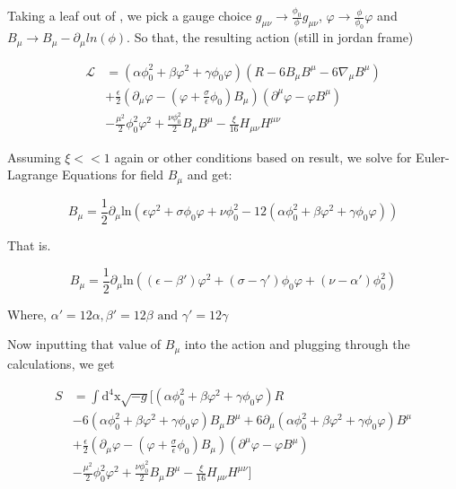 \documentclass{article}
\begin{document}
Taking a leaf out of \cite{barker2024poincaregaugetheoryconformal}, we pick a gauge choice $g_{\mu \nu} \rightarrow \frac{\phi_0}{\phi} g_{\mu \nu}$, $\varphi \rightarrow \frac{\phi}{\phi_0} \varphi$ and $B_{\mu} \rightarrow B_{\mu} - \partial_{\mu} ln(\phi)$. So that, the resulting action (still in jordan frame)

\begin{equation}
    \begin{aligned}
        \mathcal{L} &= (\alpha \phi^2_0 + \beta \varphi^2 + \gamma \phi_0 \varphi) (R - 6B_{\mu} B^{\mu} - 6\nabla_\mu B^\mu) \\
        &+ \frac{\epsilon}{2} (\partial_\mu \varphi - (\varphi + \frac{\sigma}{\epsilon} \phi_0)B_\mu)(\partial^\mu \varphi - \varphi B^\mu)\\
        &- \frac{\mu^2}{2} \phi^2_0 \varphi^2 + \frac{\nu \phi_{0}^{2}}{2} B_\mu B^\mu - \frac{\xi}{16} H_{\mu\nu}H^{\mu\nu}
    \end{aligned}
\end{equation}

Assuming $\xi << 1$ again or other conditions based on result, we solve for Euler-Lagrange Equations for field $B_\mu$ and get:

\begin{equation}
    B_\mu = \frac{1}{2} \partial_\mu \text{ln}(\epsilon \varphi^2 + \sigma \phi_0 \varphi + \nu \phi^2_0 -12 (\alpha \phi^2_0 + \beta \varphi^2 + \gamma \phi_0 \varphi))
\end{equation}

That is.

\begin{equation}
    B_\mu = \frac{1}{2} \partial_\mu \text{ln}((\epsilon - \beta') \varphi^2 + (\sigma - \gamma') \phi_0 \varphi + (\nu - \alpha')\phi^2_0)
\end{equation}

Where, $\alpha' = 12\alpha, \beta' = 12\beta \text{ and } \gamma' = 12 \gamma$

Now inputting that value of $B_\mu$ into the action and plugging through the calculations, we get

\begin{equation}
    \begin{aligned}
        S &= \int \text{d}^4\text{x} \sqrt{-g} [ (\alpha \phi^2_0 + \beta \varphi^2 + \gamma \phi_0 \varphi) R \\
          & - 6 (\alpha \phi^2_0 + \beta \varphi^2 + \gamma \phi_0 \varphi)B_{\mu} B^{\mu} + 6\partial_\mu (\alpha \phi^2_0 + \beta \varphi^2 + \gamma \phi_0 \varphi)B^\mu \\
        &+ \frac{\epsilon}{2} (\partial_\mu \varphi - (\varphi + \frac{\sigma}{\epsilon} \phi_0)B_\mu)(\partial^\mu \varphi - \varphi B^\mu)\\
        &- \frac{\mu^2}{2} \phi^2_0 \varphi^2 + \frac{\nu \phi_{0}^{2}}{2} B_\mu B^\mu - \frac{\xi}{16} H_{\mu\nu}H^{\mu\nu} ] 
    \end{aligned}
\end{equation}
\end{document}
